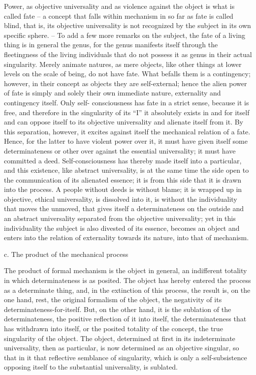 Power, as objective universality and as violence against the object is what is
called fate – a concept that falls within mechanism in so far as fate is called
blind, that is, its objective universality is not recognized by the subject in
its own specific sphere. – To add a few more remarks on the subject, the
fate of a living thing is in general the genus, for the genus manifests itself
through the fleetingness of the living individuals that do not possess it as
genus in their actual singularity. Merely animate natures, as mere objects,
like other things at lower levels on the scale of being, do not have fate.
What befalls them is a contingency; however, in their concept as objects
they are self-external; hence the alien power of fate is simply and solely
their own immediate nature, externality and contingency itself. Only self-
consciousness has fate in a strict sense, because it is free, and therefore in the
singularity of its “I” it absolutely exists in and for itself and can oppose itself
to its objective universality and alienate itself from it. By this separation,
however, it excites against itself the mechanical relation of a fate. Hence,
for the latter to have violent power over it, it must have given itself some
determinateness or other over against the essential universality; it must
have committed a deed. Self-consciousness has thereby made itself into a
particular, and this existence, like abstract universality, is at the same time
the side open to the communication of its alienated essence; it is from this
side that it is drawn into the process. A people without deeds is without
blame; it is wrapped up in objective, ethical universality, is dissolved into
it, is without the individuality that moves the unmoved, that gives itself
a determinateness on the outside and an abstract universality separated
from the objective universality; yet in this individuality the subject is also
divested of its essence, becomes an object and enters into the relation of
externality towards its nature, into that of mechanism.

c. The product of the mechanical process

The product of formal mechanism is the object in general,
an indifferent totality in which determinateness is as posited.
The object has hereby entered the process as a determinate thing,
and, in the extinction of this process,
the result is, on the one hand, rest,
the original formalism of the object,
the negativity of its determinateness-for-itself.
But, on the other hand, it is the
sublation of the determinateness,
the positive reflection of it into itself,
the determinateness that has withdrawn into itself,
or the posited totality of the concept,
the true singularity of the object.
The object, determined at first
in its indeterminate universality,
then as particular, is now determined
as an objective singular,
so that in it that reflective semblance of singularity,
which is only a self-subsistence opposing itself
to the substantial universality,
is sublated.


